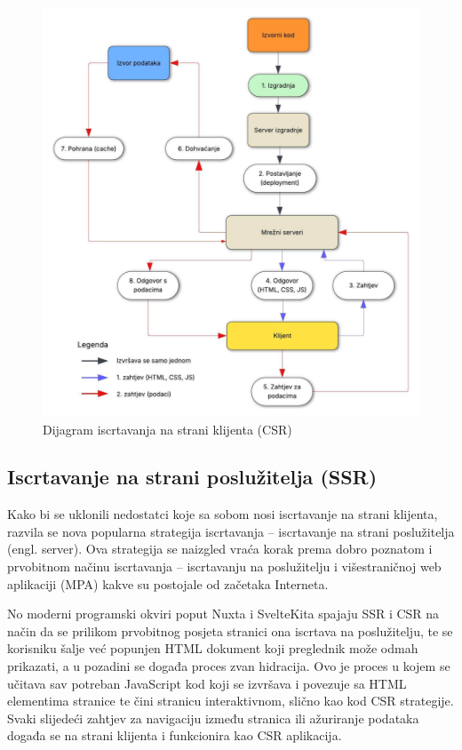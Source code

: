 \begin{figure}[H]
    \centering
    \includegraphics[width=\textwidth]{slike/uvod/CSR.jpg}
    \caption{Dijagram iscrtavanja na strani klijenta (CSR)}
    \label{fig:csr-diagram}
\end{figure}

\vfill

\subsection{Iscrtavanje na strani poslužitelja (SSR)}

Kako bi se uklonili nedostatci koje sa sobom nosi iscrtavanje na strani klijenta, razvila se nova popularna strategija iscrtavanja – iscrtavanje na strani poslužitelja (engl. server). Ova strategija se naizgled vraća korak prema dobro poznatom i prvobitnom načinu iscrtavanja – iscrtavanju na poslužitelju i višestraničnoj web aplikaciji (MPA) kakve su postojale od začetaka Interneta.

\bigskip

No moderni programski okviri poput Nuxta i SvelteKita spajaju SSR i CSR na način da se prilikom prvobitnog posjeta stranici ona iscrtava na poslužitelju, te se korisniku šalje već popunjen HTML dokument koji preglednik može odmah prikazati, a u pozadini se događa proces zvan hidracija. Ovo je proces u kojem se učitava sav potreban JavaScript kod koji se izvršava i povezuje sa HTML elementima stranice te čini stranicu interaktivnom, slično kao kod CSR strategije. Svaki slijedeći zahtjev za navigaciju između stranica ili ažuriranje podataka događa se na strani klijenta i funkcionira kao CSR aplikacija.

